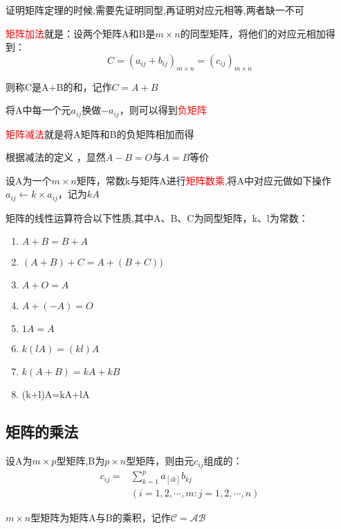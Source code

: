 \begin{note}
	证明矩阵定理的时候,需要先证明同型,再证明对应元相等,两者缺一不可
\end{note}

\begin{definition}
\textcolor{red}{矩阵加法}就是：设两个矩阵A和B是$m\times n$的同型矩阵，将他们的对应元相加得到：
\begin{equation*}
C=(a_{ij}+b_{ij})_{m\times n}=(c_{ij})_{m\times n}
\end{equation*}

则称C是A+B的和，记作$C=A+B$

\end{definition}

将A中每一个元$a_{ij}$换做$-a_{ij}$，则可以得到\textcolor{red}{负矩阵}

\textcolor{red}{矩阵减法}就是将A矩阵和B的负矩阵相加而得

根据减法的定义 ，显然$A-B=O$与$A=B$等价

\begin{definition}
	设A为一个$m\times n$矩阵，常数k与矩阵A进行\textcolor{red}{矩阵数乘},将A中对应元做如下操作$a_{ij}\leftarrow k\times a_{ij}$，记为$kA$
\end{definition}

矩阵的线性运算符合以下性质,其中A、B、C为同型矩阵，k、l为常数：
\begin{theorem}
	\begin{enumerate}
		\item {$A+B=B+A$}
		\item {$(A+B)+C=A+(B+C))$}
		\item {$A+O=A$}
		\item {$A+(-A)=O$}
		\item {$1A=A$}
		\item {$k(lA)=(kl)A$}
		\item {$k(A+B)=kA+kB$}
		\item {(k+l)A=kA+lA}
	\end{enumerate}
\end{theorem}


\subsection{矩阵的乘法}


\begin{definition}
	设A为$m\times p$型矩阵,B为$p\times n$型矩阵，则由元$c_{ij}$组成的：
	\begin{equation*}
		\begin{aligned}
			c_{ij}=&\sum_{k=1}^{p} a_[ik]b_{kj}\\
			&(i=1,2,\cdots,m:j=1,2,\cdots,n)
		\end{aligned}
	\end{equation*}

	$m\times n$型矩阵为矩阵A与B的乘积，记作$\mathcal{C=AB}$
\end{definition}

